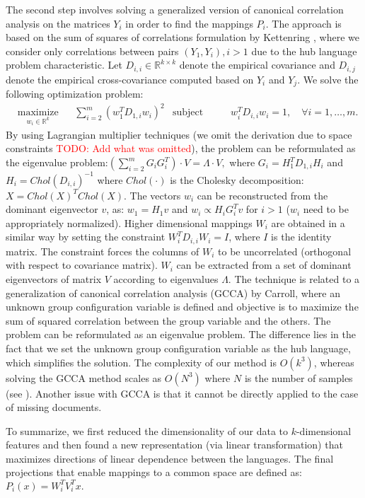 \documentclass[twoside,11pt]{article}
\newcommand{\todo}[1]{\textcolor{red}{TODO: #1}}
\newcommand{\RR}{\mathbb{R}}
\begin{document}
{The second step involves solving a generalized version of canonical correlation analysis on the matrices $Y_i$ in order to find the mappings $P_i$. The approach is based on the sum of squares of correlations formulation by Kettenring \cite{Kettenring}, where we consider only correlations between pairs $(Y_1, Y_i), i >1$ due to the hub language problem characteristic. Let $D_{i,i} \in \RR^{k \times k}$ denote the empirical covariance and $D_{i,j}$ denote the empirical cross-covariance computed based on $Y_i$ and $Y_j$. We solve the following optimization problem:
\begin{equation*}
  \begin{aligned}
    & \underset{w_i \in \RR^{k}}{\text{maximize}}
    & & \sum_{i = 2}^m  \left(w_1^T D_{1,i} w_i \right)^2
    & \text{subject to}
    & & w_i^T D_{i,i} w_i = 1, \quad\forall i = 1,\ldots, m.
\end{aligned}
\end{equation*}
By using Lagrangian multiplier techniques (we omit the derivation due to space constraints \todo{Add what was omitted}), the problem can be reformulated as the eigenvalue problem:$\left(\sum_{i=2}^m G_i G_i^T\right) \cdot V = \Lambda \cdot V,$ where $G_i = H_1^T D_{1,i} H_i$ and $H_i = Chol(D_{i,i})^{-1}$ where $Chol(\cdot)$ is the Cholesky decomposition: $X = Chol(X)^T Chol(X)$. The vectors $w_i$ can be reconstructed from the dominant eigenvector $v$, as: $w_1 = H_1 v$  and $w_i \propto H_i  G_i^T  v$ for $i >1$ ($w_i$ need to be appropriately normalized). Higher dimensional mappings $W_i$ are obtained in a similar way by setting the constraint $W_i^T D_{i,i} W_i = I$, where $I$ is the identity matrix. The constraint forces the columns of $W_i$ to be uncorrelated (orthogonal with respect to covariance matrix). $W_i$ can be extracted from a set of dominant eigenvectors of matrix $V$ according to eigenvalues $\Lambda$. The technique is related to a generalization of canonical correlation analysis (GCCA) by Carroll\cite{Carroll}, where an unknown group configuration variable is defined and objective is to maximize the sum of squared correlation between the group variable and the others. The problem can be reformulated as an eigenvalue problem. The difference lies in the fact that we set the unknown group configuration variable as the hub language, which simplifies the solution. The complexity of our method is $O(k^3)$, whereas solving the GCCA method scales as $O(N^3)$ where $N$ is the number of samples (see \cite{gifi}). Another issue with GCCA is that it cannot be directly applied to the case of missing documents.

To summarize, we first reduced the dimensionality of our data to $k$-dimensional features and then found a new representation (via linear transformation) that maximizes directions of linear dependence between the languages. The final projections that enable mappings to a common space are defined as: $P_i(x) = W_i^T V_i^T x.$
}
\end{document}
